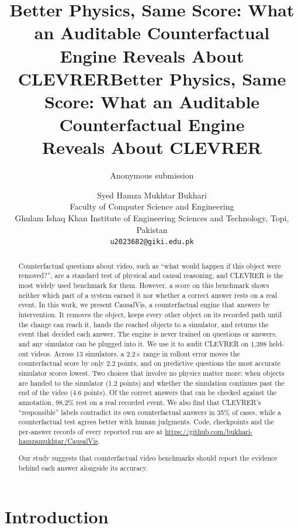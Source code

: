 \IfFileExists{TMLR}{\documentclass[10pt]{article}}%
\title{Better Physics, Same Score: What an Auditable Counterfactual Engine Reveals About CLEVRER}
\title{Better Physics, Same Score: What an Auditable Counterfactual Engine\\Reveals About CLEVRER}
\author{Anonymous submission}
\author{Syed Hamza Mukhtar Bukhari\\
  Faculty of Computer Science and Engineering\\
  Ghulam Ishaq Khan Institute of Engineering Sciences and Technology, Topi, Pakistan\\
  {\tt\small u2023682@giki.edu.pk}}
\date{}
\newif\ifanon
\newcommand{\sys}{CausalVis}
\begin{document}
\maketitle

\begin{abstract}
Counterfactual questions about video, such as ``what would happen if this object were removed?'', are a standard test of physical and causal reasoning, and CLEVRER is the most widely used benchmark for them.
However, a score on this benchmark shows neither which part of a system earned it nor whether a correct answer rests on a real event.
In this work, we present \sys{}, a counterfactual engine that answers by intervention.
It removes the object, keeps every other object on its recorded path until the change can reach it, hands the reached objects to a simulator, and returns the event that decided each answer.
The engine is never trained on questions or answers, and any simulator can be plugged into it.
We use it to audit CLEVRER on 1,398 held-out videos.
Across 13 simulators, a 2.2$\times$ range in rollout error moves the counterfactual score by only 2.2 points, and on predictive questions the most accurate simulator scores lowest.
Two choices that involve no physics matter more: when objects are handed to the simulator (1.2 points) and whether the simulation continues past the end of the video (4.6 points).
Of the correct answers that can be checked against the annotation, 98.2\% rest on a real recorded event.
We also find that CLEVRER's ``responsible'' labels contradict its own counterfactual answers in 35\% of cases, while a counterfactual test agrees better with human judgments.
\ifanon Code, checkpoints and the per-answer records of every reported run will be released.

\else Code, checkpoints and the per-answer records of every reported run are at {\small \url{https://github.com/bukhari-hamzamukhtar/CausalVis}}.

\fi
Our study suggests that counterfactual video benchmarks should report the evidence behind each answer alongside its accuracy.
\end{abstract}

\section{Introduction}
\label{sec:intro}
\end{document}
